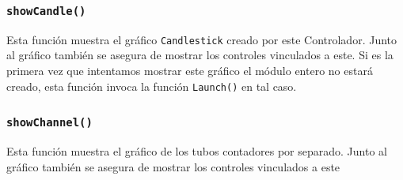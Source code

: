 		\subsubsection{\texttt{showCandle()}}
			Esta función muestra el gráfico \texttt{Candlestick} creado por este Controlador. Junto al gráfico también se asegura de
			mostrar los controles vinculados a este. Si es la primera vez que intentamos mostrar este gráfico el módulo entero no estará
			creado, esta función invoca la función \texttt{Launch()} en tal caso.
		\subsubsection{\texttt{showChannel()}}
			Esta función muestra el gráfico de los tubos contadores por separado. Junto al gráfico también se asegura de mostrar los
			controles vinculados a este

